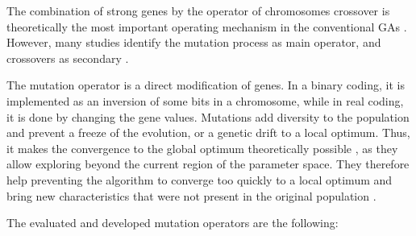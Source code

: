 \documentclass[twocol]{ametsoc}
\begin{document}
The combination of strong genes by the operator of chromosomes crossover is theoretically the most important operating mechanism in the conventional GAs \citep{Holland1992b,Back1993b}. However, many studies identify the mutation process as main operator, and crossovers as secondary \citep[see][]{Back1992a,Back1996a,Back1996b,Smith1997a,Deb1999,Haupt2004,Costa2005a,Costa2007a}.

The mutation operator is a direct modification of genes. In a binary coding, it is implemented as an inversion of some bits in a chromosome, while in real coding, it is done by changing the gene values. Mutations add diversity to the population and prevent a freeze of the evolution, or a genetic drift to a local optimum. Thus, it makes the convergence to the global optimum theoretically possible \citep{Beasley1993a}, as they allow exploring beyond the current region of the parameter space. They therefore help preventing the algorithm to converge too quickly to a local optimum and bring new characteristics that were not present in the original population \citep{Haupt2004}. 

The evaluated and developed mutation operators are the following:
\end{document}

